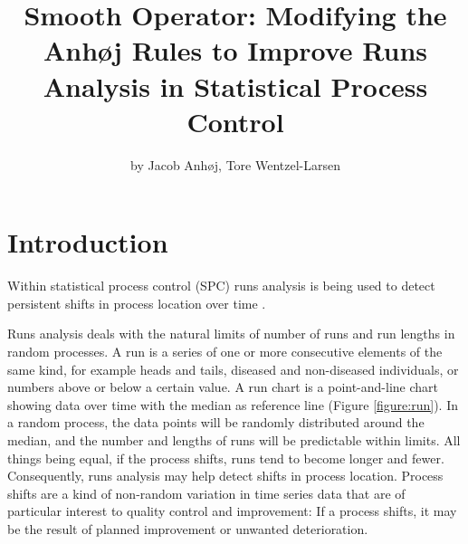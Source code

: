 \title{Smooth Operator: Modifying the Anhøj Rules to Improve Runs Analysis in
Statistical Process Control}
\author{by Jacob Anhøj, Tore Wentzel-Larsen}

\maketitle



\hypertarget{introduction}{%
\section{Introduction}\label{introduction}}

Within statistical process control (SPC) runs analysis is being used to
detect persistent shifts in process location over time
\citep{anhoej2018}.

Runs analysis deals with the natural limits of number of runs and run
lengths in random processes. A run is a series of one or more
consecutive elements of the same kind, for example heads and tails,
diseased and non-diseased individuals, or numbers above or below a
certain value. A run chart is a point-and-line chart showing data over
time with the median as reference line (Figure \ref{figure:run}). In a
random process, the data points will be randomly distributed around the
median, and the number and lengths of runs will be predictable within
limits. All things being equal, if the process shifts, runs tend to
become longer and fewer. Consequently, runs analysis may help detect
shifts in process location. Process shifts are a kind of non-random
variation in time series data that are of particular interest to quality
control and improvement: If a process shifts, it may be the result of
planned improvement or unwanted deterioration.

